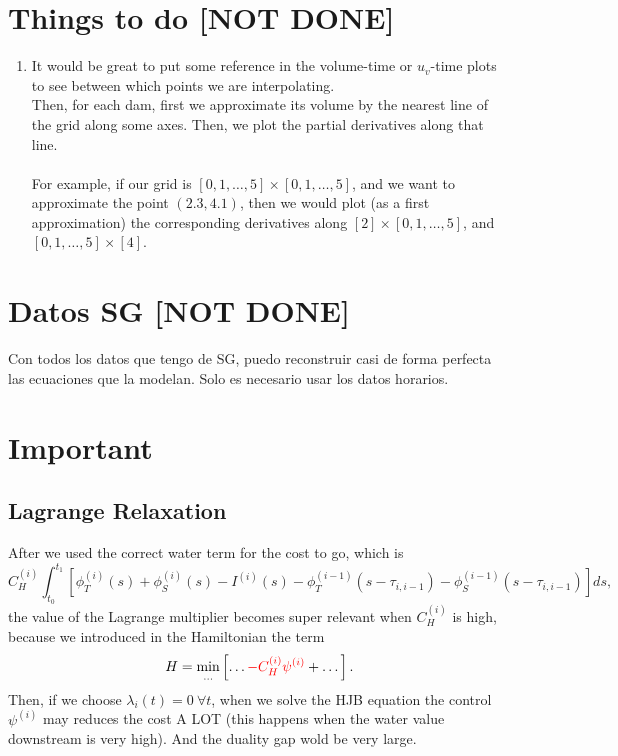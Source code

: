 \documentclass[12pt]{article}
\theoremstyle{definition}
\theoremstyle{remark}
\begin{document}
\section{Things to do [{\color{red}NOT DONE}]}

\begin{enumerate}

\item It would be great to put some reference in the volume-time or $u_v$-time plots to see between which points we are interpolating.\\
Then, for each dam, first we approximate its volume by the nearest line of the grid along some axes. Then, we plot the partial derivatives along that line.\\
\quad\\
For example, if our grid is $[0,1,\dots,5]\times[0,1,\dots,5]$, and we want to approximate the point $(2.3,4.1)$, then we would plot (as a first approximation) the corresponding derivatives along $[2]\times[0,1,\dots,5]$, and $[0,1,\dots,5]\times[4]$.

\end{enumerate}

\section{Datos SG [{\color{red}NOT DONE}]}

Con todos los datos que tengo de SG, puedo reconstruir casi de forma perfecta las ecuaciones que la modelan. Solo es necesario usar los datos horarios.

\section{Important}

\subsection{Lagrange Relaxation}

After we used the correct water term for the cost to go, which is
\begin{equation*}
C_H^{(i)}\int_{t_0}^{t_1}\left[\phi_T^{(i)}(s)+\phi_S^{(i)}(s)-I^{(i)}(s)-\phi_T^{(i-1)}(s-\tau_{i,i-1})-\phi_S^{(i-1)}(s-\tau_{i,i-1})\right]ds,
\end{equation*}
the value of the Lagrange multiplier becomes super relevant when $C_H^{(i)}$ is high, because we introduced in the Hamiltonian the term
\begin{equation*}
H=\min_{\dots}\left[\dots{\color{red} -C_H^{(i)}\psi^{(i)}}+\dots\right].
\end{equation*}
Then, if we choose $\lambda_i(t)=0\ \forall t$, when we solve the HJB equation the control $\psi^{(i)}$ may reduces the cost A LOT (this happens when the water value downstream is very high). And the duality gap wold be very large.
\end{document}
